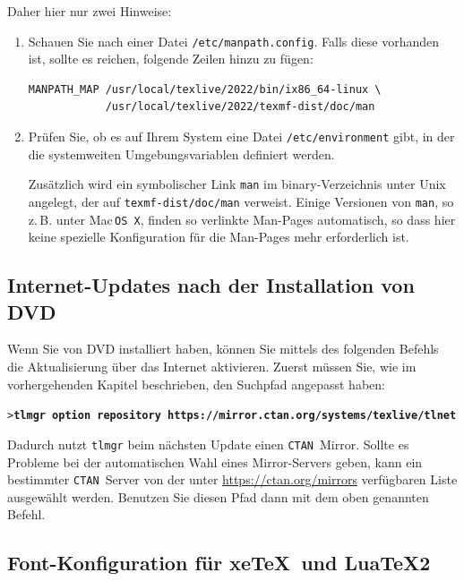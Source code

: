 \documentclass[12pt,ngerman,a4paper,fullparskip]{scrreprt}
\newcommand{\acro}[1]{\texttt{#1}}
\newcommand{\cmdname}[1]{\texttt{#1}}
\newcommand{\code}[1]{\texttt{#1}}
\newcommand{\filename}[1]{\texttt{#1}}
\newcommand{\dirname}[1]{\texttt{#1}}
\newcommand{\Ucom}[1]{\textbf{\texttt{#1}}}
\providecommand*{\CTAN}{\acro{CTAN}\xspace}
\providecommand*{\MacOSX}{Mac\,\acro{OS\,X}\xspace}
\begin{document}
Daher hier nur zwei Hinweise: 

\begin{enumerate}
\item Schauen Sie nach einer Datei
\filename{/etc/manpath.config}. Falls diese vorhanden ist, sollte es reichen, folgende Zeilen
hinzu zu fügen:

\begin{verbatim}
MANPATH_MAP /usr/local/texlive/2022/bin/ix86_64-linux \
            /usr/local/texlive/2022/texmf-dist/doc/man
\end{verbatim}

\item Prüfen Sie, ob es auf Ihrem System eine Datei \filename{/etc/environment} gibt, in der die
systemweiten Umgebungsvariablen definiert werden.

Zusätzlich wird ein symbolischer Link \code{man} im binary-Verzeichnis unter
Unix angelegt, der auf \dirname{texmf-dist/doc/man} verweist. Einige Versionen von \code{man}, so z.\,B. unter \MacOSX, finden so verlinkte Man-Pages automatisch, so dass hier keine spezielle
Konfiguration für die Man-Pages mehr erforderlich ist.

\end{enumerate}

\subsection{Internet-Updates nach der Installation von DVD}
\label{sec:dvd-install-net-updates}


Wenn Sie von DVD installiert haben, können Sie mittels des folgenden Befehls die Aktualisierung über das Internet aktivieren. Zuerst müssen Sie, wie im vorhergehenden Kapitel beschrieben, den Suchpfad angepasst haben:

\begin{alltt}
> \Ucom{tlmgr option repository https://mirror.ctan.org/systems/texlive/tlnet}
\end{alltt}

\noindent Dadurch nutzt \cmdname{tlmgr} beim nächsten Update einen \CTAN\ Mirror. Sollte es Probleme bei der automatischen Wahl eines Mirror-Servers geben, kann ein bestimmter \CTAN\ Server von der unter \url{https://ctan.org/mirrors} verfügbaren Liste ausgewählt werden. Benutzen Sie diesen Pfad dann mit dem oben genannten Befehl.

\subsection{Font-Konfiguration für xe\TeX\ und Lua\TeX2}\label{sec:font-conf-xetex}
\end{document}
